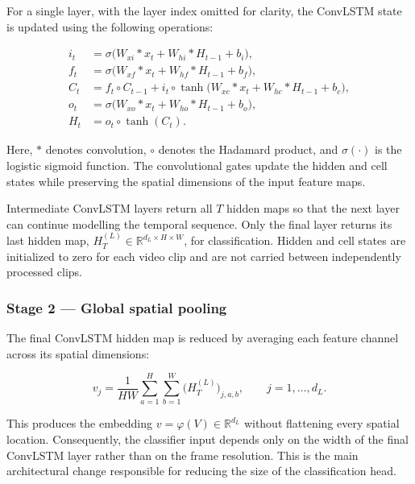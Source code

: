 \documentclass[journal,article,submit,moreauthors]{Definitions/mdpi}
\newcommand{\R}{\mathbb{R}}
\begin{document}
    For a single layer, with the layer index omitted for 
    clarity, the ConvLSTM state is updated using the 
    following operations:

    \begin{align}
        i_t &= \sigma\big(W_{xi} * x_t + W_{hi} * H_{t-1} 
        + b_i\big), \label{eq:input_gate} \\
        f_t &= \sigma\big(W_{xf} * x_t + W_{hf} * H_{t-1} 
        + b_f\big), \label{eq:forget_gate} \\
        C_t &= f_t \circ C_{t-1} + i_t \circ \tanh\big(
            W_{xc} * x_t + W_{hc} * H_{t-1} + b_c\big), 
            \label{eq:cell_state} \\
        o_t &= \sigma\big(W_{xo} * x_t + W_{ho} * H_{t-1}
         + b_o\big), \label{eq:output_gate} \\
        H_t &= o_t \circ \tanh(C_t). 
        \label{eq:hidden_state}
    \end{align}

    Here, $\ast$ denotes convolution, $\circ$ denotes the 
    Hadamard product, and $\sigma(\cdot)$ is the logistic 
    sigmoid function. The convolutional gates update the 
    hidden and cell states while preserving the spatial 
    dimensions of the input feature maps.

    Intermediate ConvLSTM layers return all $T$ hidden 
    maps so that the next layer can continue modelling 
    the temporal sequence. Only the final layer returns
    its last hidden map,
    $H_T^{(L)}\in\R^{d_L\times H\times W}$, for 
    classification. Hidden and cell states are initialized 
    to zero for each video clip and are not carried between 
    independently processed clips.


    \subsubsection{Stage 2 --- Global spatial pooling}

    The final ConvLSTM hidden map is reduced by averaging 
    each feature channel across its spatial dimensions:

    \begin{equation}
        v_j = \frac{1}{HW}\sum_{a=1}^{H}\sum_{b=1}^{W}
        \big(H_T^{(L)}\big)_{j,a,b},
        \qquad j=1,\ldots,d_L.
        \label{eq:pooling}
    \end{equation}

    This produces the embedding $v=\varphi(V)\in\R^{d_L}$ 
    without flattening every spatial location. Consequently, 
    the classifier input depends only on the width of the 
    final ConvLSTM layer rather than on the frame resolution. 
    This is the main architectural change responsible for 
    reducing the size of the classification head.
\end{document}
